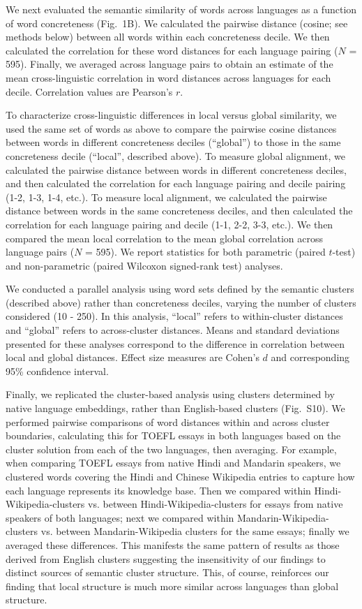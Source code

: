 \documentclass[9pt,twocolumn,twoside,lineno]{pnas-new}
\begin{document}
{ We next evaluated the semantic similarity of words across languages as a function of word concreteness (Fig.\ 1B). We calculated the pairwise distance (cosine; see methods below) between all words within each concreteness decile. We then calculated the correlation for these word distances for each language pairing ($N$ = 595). Finally, we averaged across language pairs to obtain an estimate of the mean cross-linguistic correlation in word distances across languages for each decile.  Correlation values are Pearson's $r$. 

To characterize cross-linguistic differences in local versus global similarity, we used the same set of words as above to compare  the pairwise cosine distances between words   in different concreteness deciles (``global'') to those in the same concreteness decile (``local'', described above). To measure  global alignment, we calculated the pairwise distance between words in different concreteness deciles, and then calculated the correlation for each language pairing and decile pairing (1-2, 1-3, 1-4, etc.). To measure local alignment, we calculated the pairwise distance between words in the same concreteness deciles, and then calculated the correlation for each language pairing and decile (1-1, 2-2, 3-3, etc.). We then compared the mean local correlation to the mean global correlation across language pairs ($N$ = 595). We report statistics for both parametric (paired $t$-test) and non-parametric (paired Wilcoxon signed-rank test) analyses. 

We conducted a parallel analysis using word sets defined by the semantic clusters (described above) rather than concreteness deciles, varying the number of clusters considered (10 - 250). In this analysis,       ``local'' refers to within-cluster distances and ``global'' refers to across-cluster distances. Means and standard deviations presented for these analyses correspond to the difference in correlation between local and global distances. Effect size measures are Cohen's $d$ and corresponding 95\% confidence interval. 

Finally, we replicated the cluster-based analysis using clusters determined by native language embeddings, rather than English-based clusters (Fig.\ S10). We performed pairwise comparisons of word distances within and across cluster boundaries, calculating this for TOEFL essays in both languages based on the cluster solution from each of the two languages, then averaging. For example, when comparing TOEFL essays from native Hindi and Mandarin speakers, we clustered words covering the Hindi and Chinese Wikipedia entries to capture how each language represents its knowledge base. Then we compared within Hindi-Wikipedia-clusters vs. between Hindi-Wikipedia-clusters for essays from native speakers of both languages; next we compared within Mandarin-Wikipedia-clusters vs. between Mandarin-Wikipedia clusters for the same essays; finally we averaged these differences. This manifests the same pattern of results as those derived from English clusters suggesting the insensitivity of our findings to distinct sources of semantic cluster structure. This, of course, reinforces our finding that local structure is much more similar across languages than global structure.

}
\end{document}
